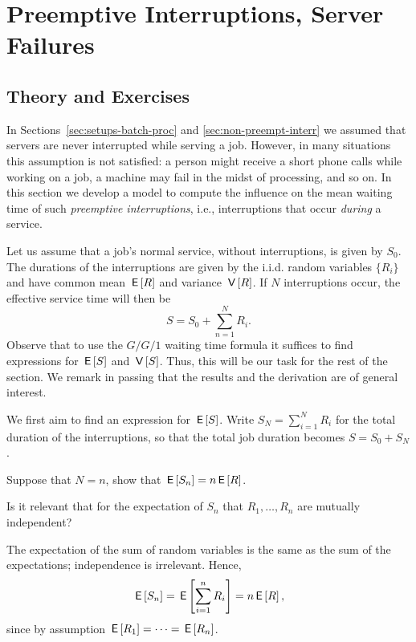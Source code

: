 \section{Preemptive Interruptions, Server Failures}
\label{sec:preempt-interr-serv}

\subsection*{Theory and Exercises}



In Sections~\ref{sec:setups-batch-proc} and \ref{sec:non-preempt-interr} we assumed that servers are never interrupted while serving a job.
However, in many situations this assumption is not satisfied: a person might receive a short phone calls while working on a job, a machine may fail in the midst of processing, and so on.
In this section we develop a model to compute the influence on the mean waiting time of such \emph{preemptive interruptions}, i.e., interruptions that occur \emph{during} a service. 

Let us assume that a job's normal service, without interruptions, is given by $S_0$. The durations of the interruptions are given by the i.i.d. random variables $\{R_i\}$ and have common mean $\,\mathsf{E}\left[R\right]$ and variance $\,\mathsf{V}\left[R\right]$. If $N$ interruptions occur, the effective service time will then be
\begin{equation*}
S= S_0 + \sum_{n=1}^N R_i.
\end{equation*}
Observe that to use the $G/G/1$ waiting time formula it suffices to find expressions for $\,\mathsf{E}\left[S\right]$ and $\,\mathsf{V}\left[S\right]$.
Thus, this will be our task for the rest of the section.
We remark in passing that the results and the derivation are of general interest.

We first aim to find an expression for $\,\mathsf{E}\left[S\right]$.  Write  $S_N = \sum_{i=1}^N R_i$ for the total duration of the interruptions, so that the total job duration becomes $S = S_0 + S_N$.

\begin{exercise}[\faFlask]
  Suppose that $N=n$, show that $\,\mathsf{E}\left[S_n\right]=n\,\mathsf{E}\left[R\right]$.
\begin{hint}
    Is it relevant that for the expectation of $S_n$ that $R_1,\ldots, R_n$ are mutually independent?
  \end{hint}
\begin{solution}
The expectation of the sum of random variables is the same as the sum of the expectations; independence is irrelevant. Hence,
\begin{equation*}
  \,\mathsf{E}\left[S_n \right] =  \,\mathsf{E}\left[\sum_{i=1}^n R_i\right]=  n \,\mathsf{E}\left[R\right], 
\end{equation*}
since by assumption $\,\mathsf{E}\left[R_1\right] = \cdots = \,\mathsf{E}\left[R_n\right]$. 
\end{solution}
\end{exercise}

